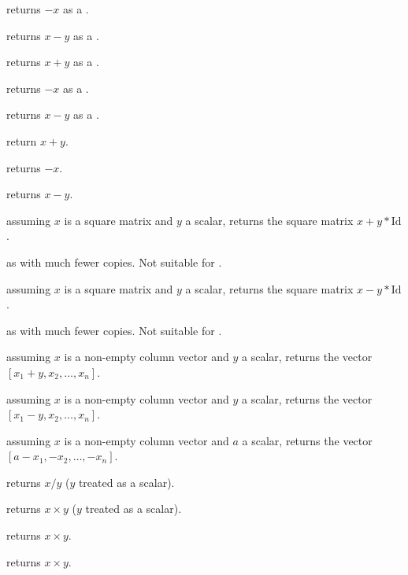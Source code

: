  returns $-x$ as a .

 returns $x - y$ as a .

 returns $x + y$ as a .

 returns $-x$ as a .

 returns $x - y$ as a .

 return $x+y$.

 returns $-x$.

 returns $x-y$.

 assuming $x$ is a square matrix
and $y$ a scalar, returns the square matrix $x + y*\text{Id}$.

 as  with much
fewer copies. Not suitable for .

 assuming $x$ is a square matrix
and $y$ a scalar, returns the square matrix $x - y*\text{Id}$.

 as  with much
fewer copies. Not suitable for .

 assuming $x$ is a non-empty column vector
and $y$ a scalar, returns the vector $[x_1 + y, x_2,\dots,x_n]$.

 assuming $x$ is a non-empty column vector
and $y$ a scalar, returns the vector $[x_1 - y, x_2,\dots,x_n]$.

 assuming $x$ is a non-empty column vector
and $a$ a scalar, returns the vector $[a - x_1, -x_2,\dots,-x_n]$.


 returns $x/y$ ($y$ treated as a scalar).



 returns $x\times y$ ($y$ treated as a
scalar).

 returns $x\times y$.

 returns $x\times y$.

